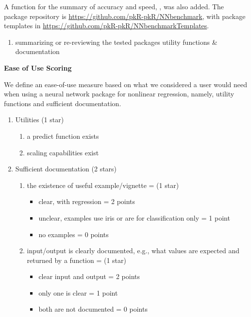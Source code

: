 A function for the summary of accuracy and speed, , was
also added. The package repository is
\url{https://github.com/pkR-pkR/NNbenchmark}, with package templates in
\url{https://github.com/pkR-pkR/NNbenchmarkTemplates}.

\begin{enumerate}
\def\labelenumi{\arabic{enumi}.}
\setcounter{enumi}{2}
\tightlist
\item
  summarizing or re-reviewing the tested packages utility functions \&
  documentation
\end{enumerate}

\textbf{Ease of Use Scoring}

We define an ease-of-use measure based on what we considered a user
would need when using a neural network package for nonlinear regression,
namely, utility functions and sufficient documentation.

\begin{enumerate}
\def\labelenumi{\arabic{enumi}.}
\tightlist
\item
  Utilities (1 star)

  \begin{enumerate}
  \def\labelenumii{\alph{enumii}.}
  \tightlist
  \item
    a predict function exists
  \item
    scaling capabilities exist
  \end{enumerate}
\item
  Sufficient documentation (2 stars)

  \begin{enumerate}
  \def\labelenumii{\alph{enumii}.}
  \tightlist
  \item
    the existence of useful example/vignette = (1 star)

    \begin{itemize}
    \tightlist
    \item
      clear, with regression = 2 points
    \item
      unclear, examples use iris or are for classification only = 1
      point
    \item
      no examples = 0 points
    \end{itemize}
  \item
    input/output is clearly documented, e.g., what values are expected
    and returned by a function = (1 star)

    \begin{itemize}
    \tightlist
    \item
      clear input and output = 2 points
    \item
      only one is clear = 1 point
    \item
      both are not documented = 0 points
    \end{itemize}
  \end{enumerate}
\end{enumerate}

